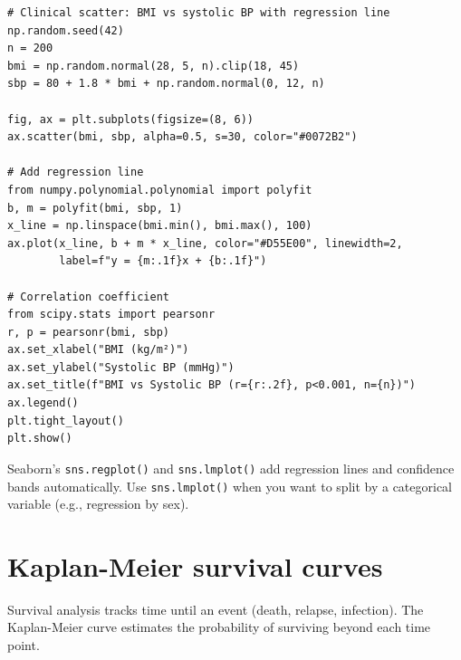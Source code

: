 \begin{verbatim}
# Clinical scatter: BMI vs systolic BP with regression line
np.random.seed(42)
n = 200
bmi = np.random.normal(28, 5, n).clip(18, 45)
sbp = 80 + 1.8 * bmi + np.random.normal(0, 12, n)

fig, ax = plt.subplots(figsize=(8, 6))
ax.scatter(bmi, sbp, alpha=0.5, s=30, color="#0072B2")

# Add regression line
from numpy.polynomial.polynomial import polyfit
b, m = polyfit(bmi, sbp, 1)
x_line = np.linspace(bmi.min(), bmi.max(), 100)
ax.plot(x_line, b + m * x_line, color="#D55E00", linewidth=2,
        label=f"y = {m:.1f}x + {b:.1f}")

# Correlation coefficient
from scipy.stats import pearsonr
r, p = pearsonr(bmi, sbp)
ax.set_xlabel("BMI (kg/m²)")
ax.set_ylabel("Systolic BP (mmHg)")
ax.set_title(f"BMI vs Systolic BP (r={r:.2f}, p<0.001, n={n})")
ax.legend()
plt.tight_layout()
plt.show()
\end{verbatim}

\begin{pythontip}
Seaborn's \texttt{sns.regplot()} and \texttt{sns.lmplot()} add regression lines and confidence bands automatically. Use \texttt{sns.lmplot()} when you want to split by a categorical variable (e.g., regression by sex).
\end{pythontip}

\section{Kaplan-Meier survival curves}

Survival analysis tracks time until an event (death, relapse, infection). The Kaplan-Meier curve estimates the probability of surviving beyond each time point.

